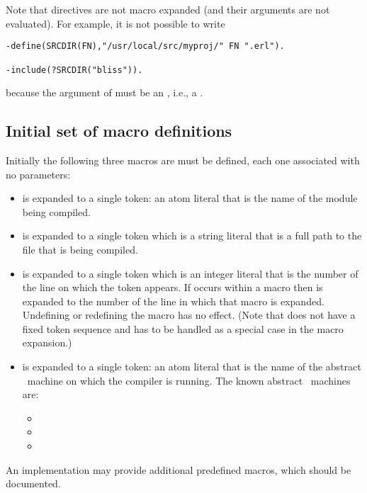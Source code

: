 Note that directives are not macro expanded (and their arguments are not evaluated).
For example, it is not
possible to write
\begin{verbatim}
-define(SRCDIR(FN),"/usr/local/src/myproj/" FN ".erl").

-include(?SRCDIR("bliss")).
\end{verbatim}
because the argument of  must be an , i.e., a .

\subsection{Initial set of macro definitions}

\label{section:initial-macros}

Initially the following three macros
\ifOld are \fi
\ifNew must be \fi
defined, each one associated with no parameters:
\begin{itemize}
\item {} is expanded to a single token: an atom literal that
is the name of the module being compiled.
\item {} is expanded to a single token which is a string
literal that is a full path to the file that is being compiled.
\item {} is expanded to a single token which is an integer
literal that is the number of the line on which the  token
appears.  If  occurs within a macro then  is expanded
to the number of the line in which that macro is expanded.  Undefining
or redefining the  macro has no effect. (Note that 
does not have a fixed token sequence and has to be handled as a
special case in the macro expansion.)
\ifOld
\item {} is expanded to a single token: an atom literal that
is the name of the abstract \Erlang\ machine on which the compiler is
running. The known abstract \Erlang\ machines are:
\begin{itemize}
\item {}
\item {}
\item {}
\end{itemize}
\fi
\iffalse
\item \T{?VERSION} is expanded to an integer token. An implementation supporting
\NewErlang\ should expand \T{?VERSION} to \T{500}.  An implementation supporting
\OldErlang\ should expand \T{?VERSION} to \T{470}.
\fi
\end{itemize}
\ifNew
An implementation may provide additional predefined macros, which
should be documented.
\fi
{}

